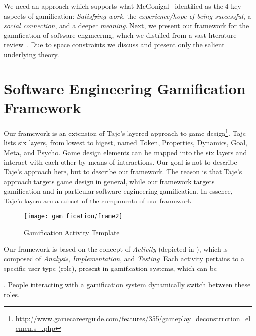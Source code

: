 We need an approach which supports what McGonigal~\cite{McGo2011a} identified as the 4 key aspects of gamification: \emph{Satisfying work}, the \emph{experience/hope of being successful}, a \emph{social connection}, and a deeper \emph{meaning}.
Next, we present our framework for the gamification of software engineering, which we distilled from a vast literature review~\cite{Mast2014a}.
Due to space constraints we discuss and present only the salient underlying theory.



\section{Software Engineering Gamification Framework}\label{sec:gamification-framework}

Our framework is an extension of Taje's layered approach to game design\footnote{\url{http://www.gamecareerguide.com/features/355/gameplay_deconstruction_elements_.php}}.
Taje lists six layers, from lowest to higest, named Token, Properties, Dynamics, Goal, Meta, and Psycho.
Game design elements can be mapped into the six layers and interact with each other by means of interactions.
Our goal is not to describe Taje's approach here, but to describe our framework.
The reason is that Taje's approach targets game design in general, while our framework targets gamification and in particular software engineering gamification.
In essence, Taje's layers are a subset of the components of our framework.

\begin{figure}[ht]
\centering
\texttt{[image: gamification/frame2]}
\caption{Gamification Activity Template}
\label{fig-frame}
\end{figure}

Our framework is based on the concept of \emph{Activity} (depicted in ), which is composed of \emph{Analysis}, \emph{Implementation}, and \emph{Testing}.
Each activity pertains to a specific user type (role), present in gamification systems, which can be .
People interacting with a gamification system dynamically switch between these roles.

